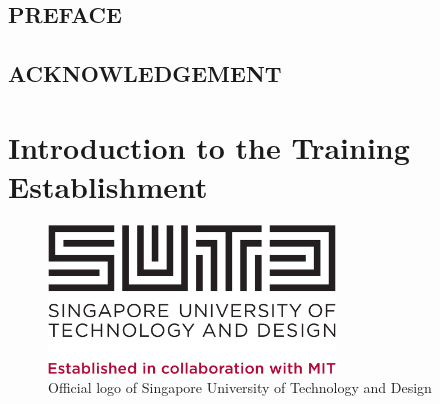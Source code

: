 \documentclass[12pt,a4paper,margin=1in]{report}
\renewcommand{\headrulewidth}{0pt}%
\renewcommand{\headrulewidth}{0pt}
\begin{document}
\renewcommand{\thepage}{ \roman{page}}
\renewcommand{\baselinestretch}{1.5}
\renewcommand{\headrulewidth}{0pt}
\begin{center}
\section*{PREFACE}
\end{center}
\par
\fontsize{12pt}{12}\selectfont

\newpage


\begin{center}
\section*{ACKNOWLEDGEMENT}
\end{center}
\fontsize{12pt}{12}\selectfont




\tableofcontents
\fancyfoot[R]{\thepage}

\begin{center}
\listoffigures
\end{center}

\begin{center}
\listoftables
\end{center}
\newpage

\renewcommand{\thepage}{\arabic{page}}
\setcounter{page}{1}%
\chapter{Introduction to the Training Establishment}



\begin{figure}[H]
\centering
\includegraphics[width=3in,keepaspectratio]{sutd.png}
\caption{Official logo of Singapore University of Technology and Design}
\label{fig3}
\end{figure}
\end{document}
